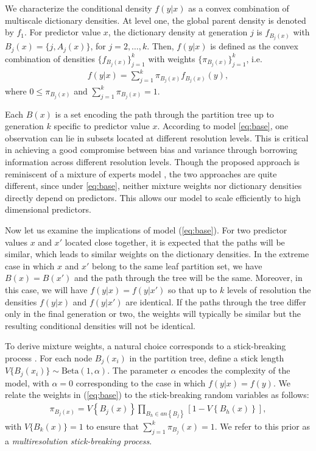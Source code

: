 \documentclass{article} %
\begin{document}
We characterize the conditional density $f(y|x)$ as a convex combination of multiscale dictionary densities.  At level one, the global parent density is denoted by $f_1$. For predictor value $x$, the dictionary density at generation $j$ is $f_{B_j(x)}$ with $B_j(x)=\{j,A_j(x)\}$, for $j=2,\ldots, k$. Then, $f(y|x)$ is defined as the convex combination of densities $\{f_{B_j(x)}\}_{j=1}^k$ with weights $\{\pi_{B_j(x)} \}_{j=1}^k$, i.e.
\begin{eqnarray}
f(y|x) = \sum_{j=1}^k \pi_{B_j(x)} f_{B_j(x)}(y),  \label{eq:base}
\end{eqnarray}
where $0 \le \pi_{B_j(x)}$ and $\sum_{j=1}^k \pi_{B_j(x)}=1$. 

Each $B(x)$ is a set encoding the path through the partition tree up to generation $k$ specific to predictor value $x$. According to model \eqref{eq:base}, one observation can lie in subsets located at different resolution levels. This is critical in achieving a good compromise between bias and variance through borrowing information across different resolution levels. Though the proposed approach is reminiscent of a mixture of experts model \cite{mixtureexperts}, the two approaches are quite different, since under \eqref{eq:base}, neither mixture weights nor dictionary densities directly depend on predictors. This allows our model to scale efficiently to high dimensional predictors.

Now let us examine the implications of model (\ref{eq:base}). For two predictor values $x$ and $x'$ located close together, it is expected that the paths will be similar, which leads to similar weights on the dictionary densities.  In the extreme case in which $x$ and $x'$ belong to the same leaf partition set, we have $B(x) = B(x')$ and the path through the tree will be the same.  Moreover, in this case, we will have $f(y|x)=f(y|x')$ so that up to $k$ levels of resolution the densities $f(y|x)$ and $f(y|x')$ are identical.  If the paths through the tree differ only in the final generation or two, the weights will typically be similar but the resulting conditional densities will not be identical. 

To derive mixture weights, a natural choice corresponds to a stick-breaking process \cite{stickbreaking}.  For each node $B_j(x_i)$ in the partition tree, define a stick length $V\{B_j(x_i)\} \sim \mbox{Beta}(1,\alpha)$.  The parameter $\alpha$ encodes the complexity of the model, with $\alpha=0$ corresponding to the case in which $f(y|x) = f(y)$.  We relate the weights in (\ref{eq:base}) to the stick-breaking random variables as follows: 
\begin{eqnarray*}
\pi_{B_j(x)} = V\left\{B_j(x)\right\} \prod_{B_h \in an\left\{B_j\right\}} \left[1 - V\left\{B_h(x)\right\}\right],
\end{eqnarray*}
with $V\{B_k(x)\}=1$ to ensure that $\sum_{j=1}^k \pi_{B_j}(x) = 1$.   We refer to this prior as a {\em multiresolution stick-breaking process}.   
\vskip 12pt
\end{document}
